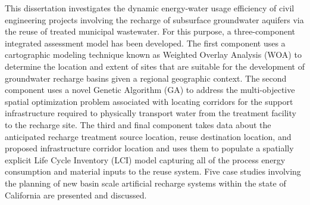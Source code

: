 
This dissertation investigates the dynamic energy-water usage efficiency of civil engineering projects involving the recharge of subsurface groundwater aquifers via the reuse of treated municipal wastewater. For this purpose, a three-component integrated assessment model has been developed. The first component uses a cartographic modeling technique known as Weighted Overlay Analysis (WOA) to determine the location and extent of sites that are suitable for the development of groundwater recharge basins given a regional geographic context. The second component uses a novel Genetic Algorithm (GA) to address the multi-objective spatial optimization problem associated with locating corridors for the support infrastructure required to physically transport water from the treatment facility to the recharge site. The third and final component takes data about the anticipated recharge treatment source location, reuse destination location, and proposed infrastructure corridor location and uses them to populate a spatially explicit Life Cycle Inventory (LCI) model capturing all of the process energy consumption and material inputs to the reuse system. Five case studies involving the planning of new basin scale artificial recharge systems within the state of California are presented and discussed.